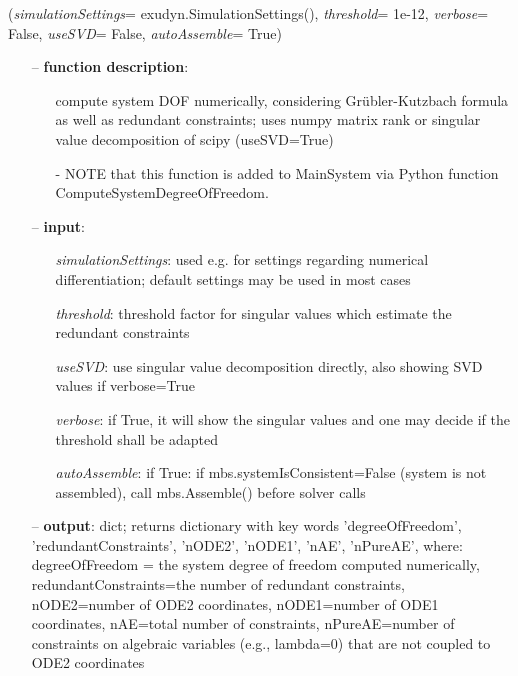 %
\begin{flushleft}
\label{sec:mainsystemextensions:ComputeSystemDegreeOfFreedom}
({\it simulationSettings}= exudyn.SimulationSettings(), {\it threshold}= 1e-12, {\it verbose}= False, {\it useSVD}= False, {\it autoAssemble}= True)
\end{flushleft}
\setlength{\itemindent}{0.7cm}
\begin{itemize}[leftmargin=0.7cm]
\item[--]
{\bf function description}: \vspace{-6pt}
\begin{itemize}[leftmargin=1.2cm]
\setlength{\itemindent}{-0.7cm}
\item[]compute system DOF numerically, considering Gr{\"u}bler-Kutzbach formula as well as redundant constraints; uses numpy matrix rank or singular value decomposition of scipy (useSVD=True)
\item[]- NOTE that this function is added to MainSystem via Python function ComputeSystemDegreeOfFreedom.
\end{itemize}
\item[--]
{\bf input}: \vspace{-6pt}
\begin{itemize}[leftmargin=1.2cm]
\setlength{\itemindent}{-0.7cm}
\item[]{\it simulationSettings}: used e.g. for settings regarding numerical differentiation; default settings may be used in most cases
\item[]{\it threshold}: threshold factor for singular values which estimate the redundant constraints
\item[]{\it useSVD}: use singular value decomposition directly, also showing SVD values if verbose=True
\item[]{\it verbose}: if True, it will show the singular values and one may decide if the threshold shall be adapted
\item[]{\it autoAssemble}: if True: if mbs.systemIsConsistent=False (system is not assembled), call mbs.Assemble() before solver calls
\end{itemize}
\item[--]
{\bf output}: dict; returns dictionary with key words 'degreeOfFreedom', 'redundantConstraints', 'nODE2', 'nODE1', 'nAE', 'nPureAE', where: degreeOfFreedom = the system degree of freedom computed numerically, redundantConstraints=the number of redundant constraints, nODE2=number of ODE2 coordinates, nODE1=number of ODE1 coordinates, nAE=total number of constraints, nPureAE=number of constraints on algebraic variables (e.g., lambda=0) that are not coupled to ODE2 coordinates

\end{itemize}
